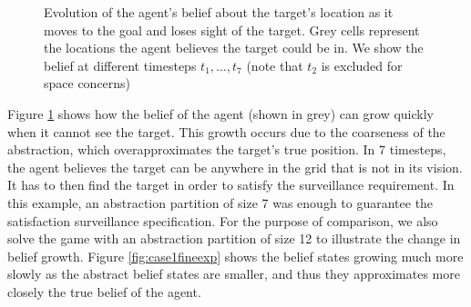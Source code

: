 \begin{figure}
\begin{minipage}{5.0cm}
\end{minipage}

	
	\caption{Evolution of the agent's belief about the target's location as it moves to the goal and loses sight of the target. Grey cells represent the locations the agent believes the target could be in. We show the belief at different timesteps $t_1,\ldots,t_7$ (note that $t_2$ is excluded for space concerns)
		}
	\label{fig:case1exp}
	
\end{figure}

Figure \ref{fig:case1exp} shows how the belief of the agent (shown in grey) can grow quickly when it cannot see the target. This growth occurs due to the coarseness of the abstraction, which overapproximates the target's true position. In 7 timesteps, the agent believes the target can be anywhere in the grid that is not in its vision. It has to then find the target in order to satisfy the surveillance requirement. In this example, an abstraction partition of size 7 was enough to guarantee the satisfaction surveillance specification.  For the purpose of comparison, we also solve the game with  an abstraction partition of size 12  to illustrate the change in belief growth. Figure \ref{fig:case1fineexp} shows the belief states growing much more slowly as the abstract belief states are smaller, and thus they approximates  more closely  the true belief of the agent.

